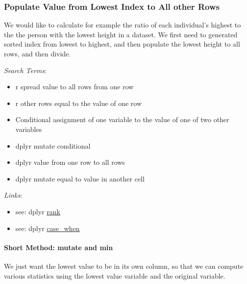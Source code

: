 \documentclass[
]{book}
\providecommand{\tightlist}{%
  \setlength{\itemsep}{0pt}\setlength{\parskip}{0pt}}
\begin{document}
\hypertarget{populate-value-from-lowest-index-to-all-other-rows}{%
\subsubsection{Populate Value from Lowest Index to All other Rows}\label{populate-value-from-lowest-index-to-all-other-rows}}

We would like to calculate for example the ratio of each individual's highest to the the person with the lowest height in a dataset. We first need to generated sorted index from lowest to highest, and then populate the lowest height to all rows, and then divide.

\emph{Search Terms}:

\begin{itemize}
\tightlist
\item
  r spread value to all rows from one row
\item
  r other rows equal to the value of one row
\item
  Conditional assignment of one variable to the value of one of two other variables
\item
  dplyr mutate conditional
\item
  dplyr value from one row to all rows
\item
  dplyr mutate equal to value in another cell
\end{itemize}

\emph{Links}:

\begin{itemize}
\tightlist
\item
  see: dplyr \href{https://dplyr.tidyverse.org/reference/ranking.html}{rank}
\item
  see: dplyr \href{https://dplyr.tidyverse.org/reference/case_when.html}{case\_when}
\end{itemize}

\hypertarget{short-method-mutate-and-min}{%
\paragraph{Short Method: mutate and min}\label{short-method-mutate-and-min}}

We just want the lowest value to be in its own column, so that we can compute various statistics using the lowest value variable and the original variable.
\end{document}
